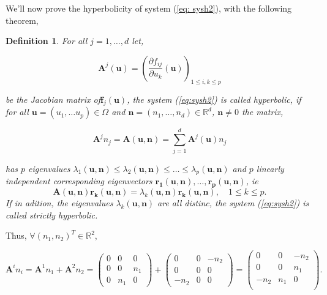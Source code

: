 \documentclass[a4paper,oneside,10pt]{report}
\newtheorem{mydef}{Definition}
\begin{document}
We'll now prove the hyperbolicity of system (\ref{eq: sysh2}), with the following theorem,

\begin{mydef}
\label{th1}
For all $j=1,\dots,d$ let,

\begin{equation}
\mathbf{A}^j(\mathbf{u}) = \left( \frac{\partial f_{ij}}{\partial u_k} (\mathbf{u}) \right)_{1\leq i,k\leq p}
\end{equation}

be the Jacobian matrix of$\mathbf{f}_j(\mathbf{u})$, the system (\ref{eq:sysh2}) is called hyperbolic, if for all $\mathbf{u}=(u_1,\dots u_p) \in\Omega$ and $\mathbf{n}=(n_1,\dots, n_d) \in \mathbb{R}^d$, $\mathbf{n} \neq 0$ the matrix,

\begin{equation}
\mathbf A^jn_j = \mathbf{A}(\mathbf{u},\mathbf{n}) = \sum\limits_{j=1}^d \mathbf{A}^j(\mathbf{u})n_j 
\end{equation}

has $p$ eigenvalues $\lambda_1(\mathbf{u},\mathbf{n}) \leq \lambda_2(\mathbf{u},\mathbf{n}) \leq \dots \leq  \lambda_p(\mathbf{u},\mathbf{n}) $ and $p$ linearly independent corresponding eigenvectors $\mathbf{r_1}(\mathbf{u},\mathbf{n}), \dots, \mathbf{r_p}(\mathbf{u},\mathbf{n})$, \textit{ie} 
\begin{equation}
\mathbf{A}(\mathbf{u},\mathbf{n})\mathbf{r_k}(\mathbf{u},\mathbf{n}) = \lambda_k(\mathbf{u},\mathbf{n})\mathbf{r_k}(\mathbf{u},\mathbf{n}), \quad 1\leq k \leq p.
\end{equation}
If in adition, the eigenvalues $\lambda_k(\mathbf{u},\mathbf{n})$ are all distinc, the system (\ref{eq:sysh2}) is called strictly hyperbolic.
\end{mydef}




Thus, $\forall (n_1,n_2 )^T \in \mathbb{R}^2$,

\begin{equation}
\mathbf{A}^i n_i = \mathbf{A}^1 n_1 + \mathbf{A}^2 n_2 =
\begin{pmatrix}
0 & 0 & 0\\
0 & 0 & n_1\\
0 & n_1 & 0
\end{pmatrix}
+
\begin{pmatrix}
0 & 0 & -n_2\\
0 & 0 & 0\\
-n_2 & 0 & 0
\end{pmatrix}
=
\begin{pmatrix}
0 & 0 & -n_2\\
0 & 0 & n_1\\
-n_2 & n_1 & 0\\
\end{pmatrix}.
\end{equation}
\end{document}
